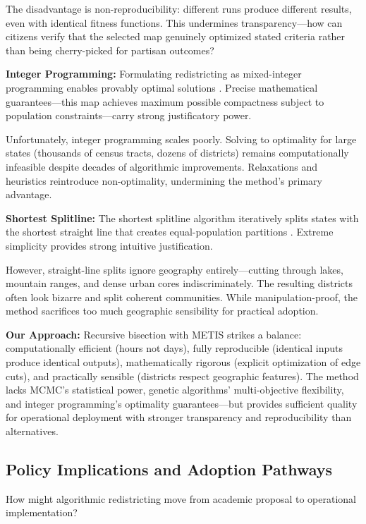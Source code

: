 The disadvantage is non-reproducibility: different runs produce different results, even with identical fitness functions. This undermines transparency—how can citizens verify that the selected map genuinely optimized stated criteria rather than being cherry-picked for partisan outcomes?

\textbf{Integer Programming:} Formulating redistricting as mixed-integer programming enables provably optimal solutions \cite{garfinkel1970optimal}. Precise mathematical guarantees—this map achieves maximum possible compactness subject to population constraints—carry strong justificatory power.

Unfortunately, integer programming scales poorly. Solving to optimality for large states (thousands of census tracts, dozens of districts) remains computationally infeasible despite decades of algorithmic improvements. Relaxations and heuristics reintroduce non-optimality, undermining the method's primary advantage.

\textbf{Shortest Splitline:} The shortest splitline algorithm iteratively splits states with the shortest straight line that creates equal-population partitions \cite{duchin2018gerrymandering}. Extreme simplicity provides strong intuitive justification.

However, straight-line splits ignore geography entirely—cutting through lakes, mountain ranges, and dense urban cores indiscriminately. The resulting districts often look bizarre and split coherent communities. While manipulation-proof, the method sacrifices too much geographic sensibility for practical adoption.

\textbf{Our Approach:} Recursive bisection with METIS strikes a balance: computationally efficient (hours not days), fully reproducible (identical inputs produce identical outputs), mathematically rigorous (explicit optimization of edge cuts), and practically sensible (districts respect geographic features). The method lacks MCMC's statistical power, genetic algorithms' multi-objective flexibility, and integer programming's optimality guarantees—but provides sufficient quality for operational deployment with stronger transparency and reproducibility than alternatives.

\subsection{Policy Implications and Adoption Pathways}

How might algorithmic redistricting move from academic proposal to operational implementation?

